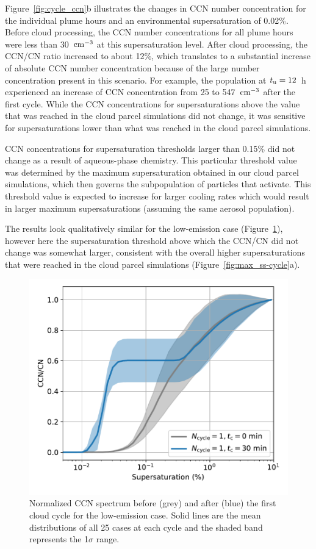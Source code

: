 \documentclass[edeposit,fullpage]{uiucthesis2009}
\begin{document}
Figure~\ref{fig:cycle_ccn}b illustrates the changes in CCN number
concentration for the individual plume hours and an environmental
supersaturation of 0.02\%. Before cloud processing, the CCN number
concentrations for all plume hours were less than 30~$\rm cm^{-3}$ at
this supersaturation level. After cloud processing, the CCN/CN
  ratio increased to about 12\%, which translates to a substantial
  increase of absolute CCN number concentration because of the large
  number concentration present in this scenario. For example, the
  population at $t_{\rm u} = 12$~h experienced an increase of CCN
  concentration from 25 to 547~$\rm cm^{-3}$ after the first
  cycle. While the CCN concentrations for supersaturations above the
  value that was reached in the cloud parcel simulations did not
  change, it was sensitive for supersaturations lower than what
  was reached in the cloud parcel simulations.

CCN concentrations for supersaturation thresholds larger than 0.15\%
did not change as a result of aqueous-phase chemistry. This particular
threshold value was determined by the maximum supersaturation obtained
in our cloud parcel simulations, which then governs the subpopulation
of particles that activate. This threshold value is expected to
increase for larger cooling rates which would result in larger maximum
supersaturations (assuming the same aerosol population).

The results look qualitatively similar for the low-emission
  case (Figure~\ref{fig:sup-ccn-low-emi}), however here the supersaturation threshold above
  which the CCN/CN did not change was somewhat larger, consistent
  with the overall higher supersaturations that were reached in the
  cloud parcel simulations (Figure~\ref{fig:max_ss-cycle}a).
  
  \begin{figure}
    \centering
    \includegraphics[scale=0.5]{chap3_figs/fig_sup4.pdf}
    \caption{Normalized CCN spectrum before (grey) and after (blue)
      the first cloud cycle for the low-emission case. Solid lines are
      the mean distributions of all 25 cases at each cycle and the
      shaded band represents the 1$\sigma$ range.}
    \label{fig:sup-ccn-low-emi}
\end{figure}
\end{document}
